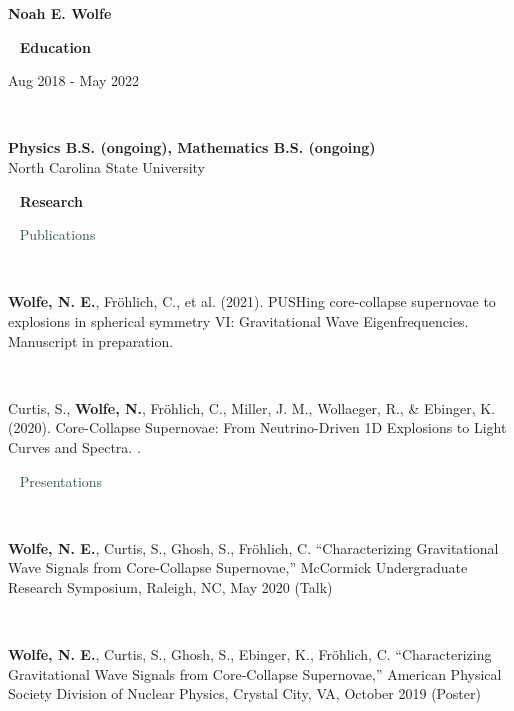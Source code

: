 \documentclass[7.5pt]{article}
\def \primarycolor   {spacecadet}
\def \secondarycolor {darkslategray}
\def \tertiarycolor  {airforceblue} %
\def \titlerectmin{0.15cm}
\def \titlerectmax{0.35cm}
\def \leftcolwidth{3.10cm}
\newcommand{\cvheader}[1]{
    \tikz{\fill [\primarycolor] (0,\titlerectmin) rectangle (\leftcolwidth,\titlerectmax);} \ 
    \textcolor{\primarycolor}{ \large{\textbf{#1}} } 
}
\newcommand{\cvsubtitle}[1]{
    \hspace{\leftcolwidth} \ \textcolor{\secondarycolor}{ \large{{#1}} }
}
\newcommand{\cventry}[4]{
    \begin{minipage}[t]{\leftcolwidth} 
        \small{
            \begin{flushright}
                #2\\
                \textcolor{\tertiarycolor}{\textit{#4}}
            \end{flushright}
        }
    \end{minipage} \ \
    \begin{minipage}[t]{\linewidth-\leftcolwidth} \normalsize{\textbf{#1} \\ #3} \end{minipage}
} %
\newcommand{\cventrysingle}[3]{
    \begin{minipage}[t]{\leftcolwidth} \small{#2 \begin{flushleft}\textcolor{\tertiarycolor}{\textit{#3}} \end{flushleft} } 
    \end{minipage} \ \
    \begin{minipage}[t]{\linewidth-\leftcolwidth} \normalsize{{#1}} \end{minipage}
}
\begin{document}

{ \begin{center}\LARGE \textbf{Noah E. Wolfe} \end{center} }

\cvheader{Education}

\cventry{Physics B.S. (ongoing), Mathematics B.S. (ongoing)}{Aug 2018 - May 2022}{North Carolina State University}{}

\cvheader{Research}

\cvsubtitle{Publications}

\cventrysingle{\textbf{Wolfe, N. E.}, Fr\"ohlich, C., et al. (2021). PUSHing core-collapse supernovae to explosions in spherical symmetry VI: Gravitational Wave Eigenfrequencies. Manuscript in preparation.}{}{}

\cventrysingle{Curtis, S., \textbf{Wolfe, N.}, Fröhlich, C., Miller, J. M., Wollaeger, R., & Ebinger, K. (2020). Core-Collapse Supernovae: From Neutrino-Driven 1D Explosions to Light Curves and Spectra. \href{https://arxiv.org/abs/2008.05498}{\color{\tertiarycolor}{arXiv preprint  arXiv:2008.05498}}.}{}{}


\iffalse
\cvsubtitle{Presentations}

\cventrysingle{\textbf{Wolfe, N. E.}, Curtis, S., Ghosh, S., Fr\"ohlich, C. “Characterizing Gravitational Wave Signals from Core-Collapse Supernovae,” McCormick Undergraduate Research Symposium, Raleigh, NC, May 2020 (Talk) \href{https://drive.google.com/file/d/1l_uCcEURbu1l5_SZtgUtiaaeLIREYsWq/view?usp=sharing}{\color{\tertiarycolor}{Slides}}}{}{}

\cventrysingle{\textbf{Wolfe, N. E.}, Curtis, S., Ghosh, S., Ebinger, K., Fr\"ohlich, C. “Characterizing Gravitational Wave Signals from Core-Collapse Supernovae,” American Physical Society Division of Nuclear Physics, Crystal City, VA, October 2019 (Poster)}{}{}
\end{document}
